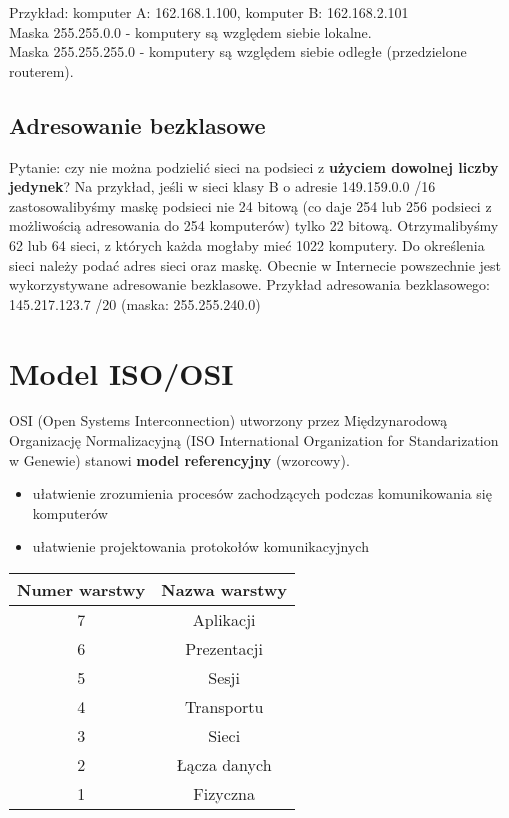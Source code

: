 \documentclass[a4paper]{article}
\begin{document}
Przykład: komputer A: 162.168.1.100, komputer B: 162.168.2.101\\
Maska 255.255.0.0 - komputery są względem siebie lokalne.\\
Maska 255.255.255.0 - komputery są względem siebie odległe (przedzielone routerem).

\subsection{Adresowanie bezklasowe}
Pytanie: czy nie można podzielić sieci na podsieci
z \textbf{użyciem dowolnej liczby jedynek}? Na przykład, jeśli w sieci klasy B o
adresie 149.159.0.0 /16 zastosowalibyśmy maskę podsieci nie 24 bitową (co daje 254 lub
256 podsieci z możliwością adresowania do 254 komputerów) tylko 22 bitową.
Otrzymalibyśmy 62 lub 64 sieci, z których każda mogłaby mieć 1022 komputery. Do określenia sieci należy podać adres
sieci oraz maskę. Obecnie w Internecie powszechnie jest wykorzystywane adresowanie
bezklasowe.
Przykład adresowania bezklasowego: 145.217.123.7 /20 (maska: 255.255.240.0)

\section{Model ISO/OSI}
OSI (Open Systems Interconnection) utworzony przez Międzynarodową Organizację
Normalizacyjną (ISO International Organization for Standarization w Genewie)
stanowi \textbf{model referencyjny} (wzorcowy).

\begin{itemize}
    \item ułatwienie zrozumienia procesów zachodzących podczas komunikowania się komputerów
    \item ułatwienie projektowania protokołów komunikacyjnych
\end{itemize}

\begin{tabular}{|c|c|}
\hline
\textbf{Numer warstwy} & \textbf{Nazwa warstwy}\\
\hline
7 & Aplikacji\\
\hline
6 & Prezentacji\\
\hline
5 & Sesji\\
\hline
4 & Transportu\\
\hline
3 & Sieci\\
\hline
2 & Łącza danych\\
\hline
1 & Fizyczna\\
\hline
\end{tabular}
\end{document}
